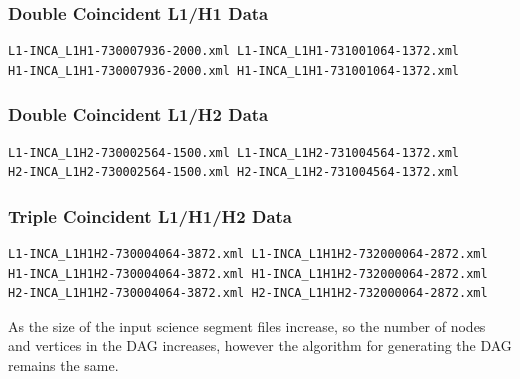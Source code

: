 \subsubsection*{Double Coincident L1/H1 Data}
\begin{verbatim}
L1-INCA_L1H1-730007936-2000.xml L1-INCA_L1H1-731001064-1372.xml 
H1-INCA_L1H1-730007936-2000.xml H1-INCA_L1H1-731001064-1372.xml
\end{verbatim}

\subsubsection*{Double Coincident L1/H2 Data}
\begin{verbatim}
L1-INCA_L1H2-730002564-1500.xml L1-INCA_L1H2-731004564-1372.xml 
H2-INCA_L1H2-730002564-1500.xml H2-INCA_L1H2-731004564-1372.xml
\end{verbatim}

\subsubsection*{Triple Coincident L1/H1/H2 Data}
\begin{verbatim}
L1-INCA_L1H1H2-730004064-3872.xml L1-INCA_L1H1H2-732000064-2872.xml 
H1-INCA_L1H1H2-730004064-3872.xml H1-INCA_L1H1H2-732000064-2872.xml 
H2-INCA_L1H1H2-730004064-3872.xml H2-INCA_L1H1H2-732000064-2872.xml
\end{verbatim}

As the size of the input science segment files increase, so the number of
nodes and vertices in the DAG increases, however the algorithm for generating
the DAG remains the same.

